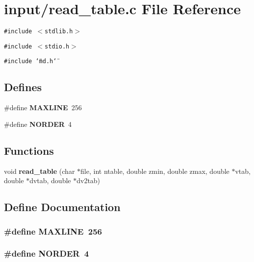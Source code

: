 \section{input/read\_\-table.c File Reference}
\label{read__table_8c}
{\tt \#include $<$stdlib.h$>$}\par
{\tt \#include $<$stdio.h$>$}\par
{\tt \#include \char`\"{}md.h\char`\"{}}\par
\subsection*{Defines}
\begin{CompactItemize}
\item 
\#define {\bf MAXLINE}~256
\item 
\#define {\bf NORDER}~4
\end{CompactItemize}
\subsection*{Functions}
\begin{CompactItemize}
\item 
void {\bf read\_\-table} (char $\ast$file, int ntable, double zmin, double zmax, double $\ast$vtab, double $\ast$dvtab, double $\ast$dv2tab)
\end{CompactItemize}


\subsection{Define Documentation}
\subsubsection{\setlength{\rightskip}{0pt plus 5cm}\#define MAXLINE~256}\label{read__table_8c_3e937c42922f7601edb17b747602c471}


\subsubsection{\setlength{\rightskip}{0pt plus 5cm}\#define NORDER~4}\label{read__table_8c_583aed7f9395eb4f571151c12d55e636}




